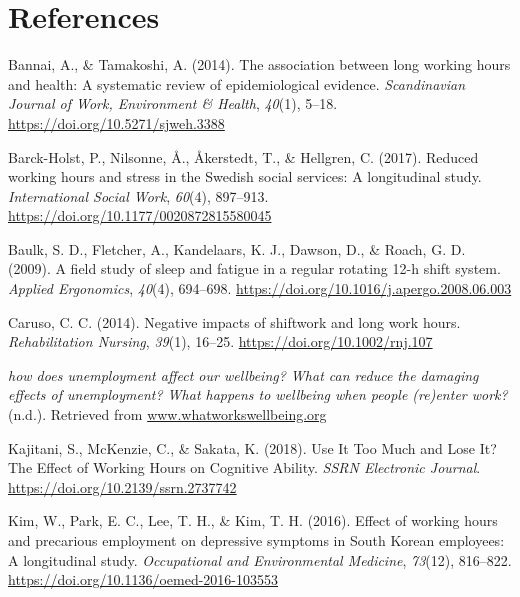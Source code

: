 \documentclass[
  english,
  man]{apa6}
\newlength{\cslhangindent}
\newenvironment{cslreferences}%
  {\setlength{\parindent}{0pt}%
  \everypar{\setlength{\hangindent}{\cslhangindent}}\ignorespaces}%
  {\par}
\begin{document}
\newpage

\hypertarget{references}{%
\section{References}\label{references}}

\begingroup
\setlength{\parindent}{-0.5in}
\setlength{\leftskip}{0.5in}

\hypertarget{refs}{}
\begin{cslreferences}
\leavevmode\hypertarget{ref-Bannai2014}{}%
Bannai, A., \& Tamakoshi, A. (2014). The association between long working hours and health: A systematic review of epidemiological evidence. \emph{Scandinavian Journal of Work, Environment \& Health}, \emph{40}(1), 5--18. \url{https://doi.org/10.5271/sjweh.3388}

\leavevmode\hypertarget{ref-Barck-Holst2017}{}%
Barck-Holst, P., Nilsonne, Å., Åkerstedt, T., \& Hellgren, C. (2017). Reduced working hours and stress in the Swedish social services: A longitudinal study. \emph{International Social Work}, \emph{60}(4), 897--913. \url{https://doi.org/10.1177/0020872815580045}

\leavevmode\hypertarget{ref-Baulk2009}{}%
Baulk, S. D., Fletcher, A., Kandelaars, K. J., Dawson, D., \& Roach, G. D. (2009). A field study of sleep and fatigue in a regular rotating 12-h shift system. \emph{Applied Ergonomics}, \emph{40}(4), 694--698. \url{https://doi.org/10.1016/j.apergo.2008.06.003}

\leavevmode\hypertarget{ref-Caruso2014}{}%
Caruso, C. C. (2014). Negative impacts of shiftwork and long work hours. \emph{Rehabilitation Nursing}, \emph{39}(1), 16--25. \url{https://doi.org/10.1002/rnj.107}

\leavevmode\hypertarget{ref-WhatWorksWellbeing2}{}%
\emph{how does unemployment affect our wellbeing? What can reduce the damaging effects of unemployment? What happens to wellbeing when people (re)enter work?} (n.d.). Retrieved from \url{www.whatworkswellbeing.org}

\leavevmode\hypertarget{ref-Kajitani2018}{}%
Kajitani, S., McKenzie, C., \& Sakata, K. (2018). Use It Too Much and Lose It? The Effect of Working Hours on Cognitive Ability. \emph{SSRN Electronic Journal}. \url{https://doi.org/10.2139/ssrn.2737742}

\leavevmode\hypertarget{ref-Kim2016}{}%
Kim, W., Park, E. C., Lee, T. H., \& Kim, T. H. (2016). Effect of working hours and precarious employment on depressive symptoms in South Korean employees: A longitudinal study. \emph{Occupational and Environmental Medicine}, \emph{73}(12), 816--822. \url{https://doi.org/10.1136/oemed-2016-103553}


\end{cslreferences}
\end{document}
